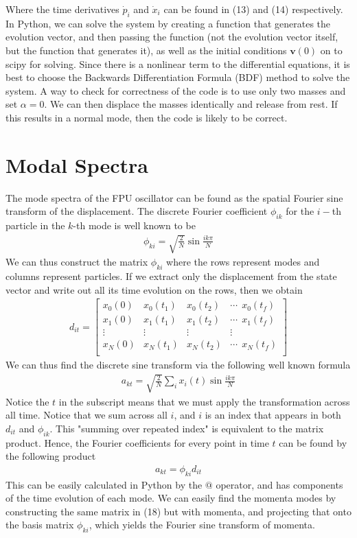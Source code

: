 \documentclass{article}
\newcommand{\ve}{\mathbf}
\begin{document}
Where the time derivatives $\dot{p}_i$ and $\dot{x}_i$ can be found in (13) and (14) respectively. In Python, 
we can solve the system by creating a function that generates the evolution vector, 
and then passing the function (not the evolution vector itself, but the function that generates it), as well as the initial conditions 
$\ve{v}(0)$ on to 
scipy for solving. Since there is a nonlinear term to the differential equations, 
it is best to choose the Backwards Differentiation Formula (BDF) method to solve the system. 
A way to check for correctness of the code is to use only two masses and set 
$\alpha=0$. We can then 
displace the masses identically and release from rest. If this results in a normal mode, then the code is likely to be correct.

\section{Modal Spectra}
The mode spectra of the FPU oscillator can be found as the spatial Fourier sine 
transform of the displacement. The discrete Fourier coefficient $\phi_{ik}$ for the 
$i-$th particle in the $k$-th mode is well known to be 
\begin{align}
    \phi_{ki}=\sqrt{\frac{2}{N}}\sin\frac{ik\pi}{N}
\end{align}
We can thus construct the matrix $\phi_{ki}$ where the rows represent modes and 
columns represent particles. If we extract only the displacement from the state vector
and write out all its time evolution on the rows, then we obtain 
\begin{align}
    d_{it}=\begin{bmatrix}
        x_0(0)& x_0(t_1) & x_0(t_2) &\cdots \ \  x_0(t_f)\\ 
        x_1(0)& x_1(t_1) & x_1(t_2) &\cdots \ \  x_1(t_f)\\ 
       \vdots& \vdots & \vdots & \vdots\\ 
        x_N(0)& x_N(t_1) & x_N(t_2) &\cdots \ \ x_N(t_f)\\ 
    \end{bmatrix}
\end{align} 
We can thus find the discrete sine transform via the following well known formula 
\begin{align}
    a_{kt}=\sqrt{\frac{2}{N}}\sum_ix_i(t)\sin{\frac{ik\pi}{N}}
\end{align}
Notice the $t$ in the subscript means that we must apply the transformation across 
all time. Notice that we sum across all $i$, and 
$i$ is an index that appears in both $d_{it}$ and $\phi_{ik}$. This "summing over repeated index"
is equivalent to the matrix product.
 Hence, the Fourier coefficients for every point in time $t$ can be found by 
the following product 
\begin{align}
    a_{kt}=\phi_{ki}d_{it}
\end{align}
This can be easily calculated in Python by the $@$ operator, and has components of the time 
evolution of each mode. We can easily find the momenta modes by constructing the same matrix 
in (18) but with momenta, and projecting that onto the basis matrix $\phi_{ki}$, which yields 
the Fourier sine transform of momenta.
\end{document}
